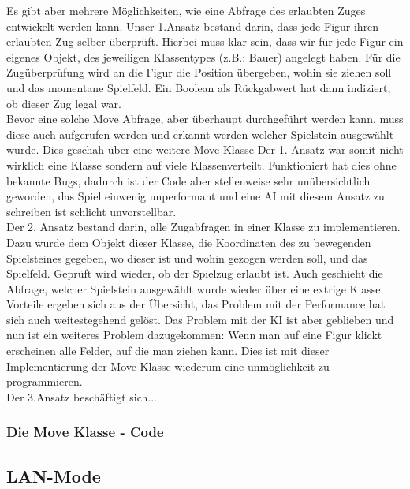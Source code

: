 \documentclass[12pt,a4paper]{article}
\begin{document}
{Es gibt aber mehrere Möglichkeiten, wie eine Abfrage des erlaubten Zuges entwickelt werden kann. Unser 1.Ansatz bestand darin, dass jede Figur ihren erlaubten Zug selber überprüft. Hierbei muss klar sein, dass wir für jede Figur ein eigenes Objekt, des jeweiligen Klassentypes (z.B.: Bauer) angelegt haben. Für die Zugüberprüfung wird an die Figur die Position übergeben, wohin sie ziehen soll und das momentane Spielfeld. Ein Boolean als Rückgabwert hat dann indiziert, ob dieser Zug legal war. \\
Bevor eine solche Move Abfrage, aber überhaupt durchgeführt werden kann, muss diese auch aufgerufen werden und erkannt werden welcher Spielstein ausgewählt wurde. Dies geschah über eine weitere Move Klasse
Der 1. Ansatz war somit nicht wirklich eine Klasse sondern auf viele Klassenverteilt. Funktioniert hat dies ohne bekannte Bugs, dadurch ist der Code aber stellenweise sehr unübersichtlich geworden, das Spiel einwenig unperformant und eine AI mit diesem Ansatz zu schreiben ist schlicht unvorstellbar. \\[2ex]
Der 2. Ansatz bestand darin, alle Zugabfragen in einer Klasse zu implementieren. Dazu wurde dem Objekt dieser Klasse, die Koordinaten des zu bewegenden Spielsteines gegeben, wo dieser ist und wohin gezogen werden soll, und das Spielfeld. Geprüft wird wieder, ob der Spielzug erlaubt ist. Auch geschieht die Abfrage, welcher Spielstein ausgewählt wurde wieder über eine extrige Klasse.\\ 
Vorteile ergeben sich aus der Übersicht, das Problem mit der Performance hat sich auch weitestegehend gelöst. Das Problem mit der KI ist aber geblieben und nun ist ein weiteres Problem dazugekommen: Wenn man auf eine Figur klickt erscheinen alle Felder, auf die man ziehen kann. Dies ist mit dieser Implementierung der Move Klasse wiederum eine unmöglichkeit zu programmieren.\\[2ex]
Der 3.Ansatz beschäftigt sich...

\subsubsection{Die Move Klasse - Code}
\label{SUBSUBSEC:MOVECODE}

\subsection{LAN-Mode}

}
\end{document}
